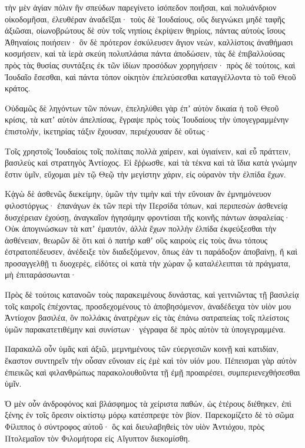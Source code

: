{τὴν μὲν ἁγίαν πόλιν ἣν σπεύδων παρεγίνετο ἰσόπεδον ποιῆσαι, καὶ πολυάνδριον οἰκοδομῆσαι, ἐλευθέραν ἀναδεῖξαι·
τοὺς δὲ Ἰουδαίους, οὕς διεγνώκει μηδὲ ταφῆς ἀξιῶσαι, οἰωνοβρώτους δὲ σὺν τοῖς νηπίοις ἐκρίψειν θηρίοις, πάντας αὐτοὺς ἴσους Ἀθηναίοις ποιήσειν·
ὃν δὲ πρότερον ἐσκύλευσεν ἅγιον νεὼν, καλλίστοις ἀναθήμασι κοσμήσειν, καὶ τὰ ἱερὰ σκεύη πολυπλάσια πάντα ἀποδώσειν, τὰς δὲ ἐπιβαλλούσας πρὸς τὰς θυσίας συντάξεις ἐκ τῶν ἰδίων προσόδων χορηγήσειν·
πρὸς δὲ τούτοις, καὶ Ἰουδαῖο ἔσεσθαι, καὶ πάντα τόπον οἰκητὸν ἐπελεύσεσθαι καταγγέλλοντα τὸ τοῦ Θεοῦ κράτος.
\par }{\PP {}Οὐδαμῶς δὲ ληγόντων τῶν πόνων, ἐπεληλύθει γὰρ ἐπʼ αὐτὸν δικαία ἡ τοῦ Θεοῦ κρίσις, τὰ κατʼ αὐτὸν ἀπελπίσας, ἔγραψε πρὸς τοὺς Ἰουδαίους τὴν ὑπογεγραμμένην ἐπιστολήν, ἱκετηρίας τάξιν ἔχουσαν, περιέχουσαν δὲ οὕτως·
\par }{\PP {}Τοῖς χρηστοῖς Ἰουδαίοις τοῖς πολίταις πολλὰ χαίρειν, καὶ ὑγιαίνειν, καὶ εὖ πράττειν, βασιλεὺς καὶ στρατηγὸς Ἀντίοχος.
Εἰ ἔῤῥωσθε, καὶ τὰ τέκνα καὶ τὰ ἴδια κατὰ γνώμην ἔστιν ὑμῖν, εὔχομαι μὲν τῷ Θεῷ τὴν μεγίστην χάριν, εἰς οὐρανὸν τὴν ἐλπίδα ἔχων.
\par }{\PP {}Κᾀγὼ δὲ ἀσθενῶς διεκείμην, ὑμῶν τὴν τιμὴν καὶ τὴν εὔνοιαν ἄν ἐμνημόνευον φιλοστόργως· ἐπανάγων ἐκ τῶν περὶ τὴν Περσίδα τόπων, καὶ περιπεσὼν ἀσθενείᾳ δυσχέρειαν ἐχούσῃ, ἀναγκαῖον ἡγησάμην φροντίσαι τῆς κοινῆς πάντων ἀσφαλείας·
Οὐκ ἀπογινώσκων τὰ κατʼ ἐμαυτόν, ἀλλὰ ἔχων πολλὴν ἐλπίδα ἐκφεύξεσθαι τὴν ἀσθένειαν,
θεωρῶν δὲ ὅτι καὶ ὁ πατήρ καθʼ οὓς καιροὺς εἰς τοὺς ἄνω τόπους ἐστρατοπέδευσεν, ἀνέδειξε τὸν διαδεξόμενον,
ὅπως ἐάν τι παράδοξον ἀποβαίνῃ, ἤ καὶ προσαγγελθῇ τι δυοχερὲς, εἰδότες οἱ κατὰ τὴν χώραν ᾧ καταλέλειπται τὰ πράγματα, μὴ ἐπιταράσσωνται·
\par }{\PP {}Πρὸς δὲ τούτοις κατανοῶν τοὺς παρακειμένους δυνάστας, καὶ γειτνιῶντας τῇ βασιλείᾳ τοῖς καιροῖς ἐπέχοντας, προσδεχομένους τὸ ἀποβησόμενον, ἀναδέδειχα τὸν υἱὸν μου Ἀντίοχον βασιλέα, ὃν πολλάκις ἀνατρέχων εἰς τὰς ἐπάνω σατραπείας τοῖς πλείστοις ὑμῶν παρακατετιθέμην καὶ συνίστων· γέγραφα δὲ πρὸς αὐτὸν τὰ ὑπογεγραμμένα.
\par }{\PP {}Παρακαλῶ οὖν ὑμᾶς καὶ ἀξιῶ, μεμνημένους τῶν εὐεργεσιῶν κοινῇ καὶ κατιδίαν, ἕκαστον συντηρεῖν τὴν οὖσαν εὔνοιαν εἰς ἐμὲ καὶ τὸν υἱόν μου.
Πέπεισμαι γὰρ αὐτὸν ἐπιεικῶς καὶ φιλανθρώπως παρακολουθοῦντα τῇ ἐμῇ προαιρέσει, συμπεριενεχθήσεσθαι ὑμῖν.
\par }{\PP {}Ὁ μὲν οὖν ἀνδροφόνος καὶ βλάσφημος τὰ χείριστα παθών, ὡς ἑτέρους διέθηκεν, ἐπὶ ξένης ἐν τοῖς ὄρεσιν οἰκτίστῳ μόρῳ κατέσπρεψε τὸν βίον.
Παρεκομίζετο δὲ τὸ σῶμα Φίλιππος ὁ σύντροφος αὐτοῦ· ὃς καὶ διευλαβηθεὶς τὸν υἱὸν Ἀντιόχου, πρὸς Πτολεμαῖον τὸν Φιλομήτορα εἰς Αἴγυπτον διεκομίσθη.

}
